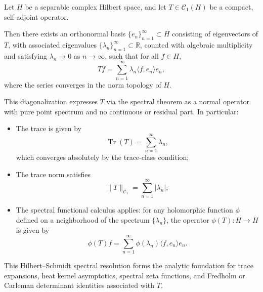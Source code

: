 \begin{definition}
\label{def:spectral_decomposition_compact}
Let \( H \) be a separable complex Hilbert space, and let \( T \in \mathcal{C}_1(H) \) be a compact, self-adjoint operator.

Then there exists an orthonormal basis \( \{ e_n \}_{n=1}^\infty \subset H \) consisting of eigenvectors of \( T \), with associated eigenvalues \( \{ \lambda_n \}_{n=1}^\infty \subset \mathbb{R} \), counted with algebraic multiplicity and satisfying \( \lambda_n \to 0 \) as \( n \to \infty \), such that for all \( f \in H \),
\[
T f = \sum_{n=1}^\infty \lambda_n \langle f, e_n \rangle e_n,
\]
where the series converges in the norm topology of \( H \).

\medskip
\noindent
This diagonalization expresses \( T \) via the spectral theorem as a normal operator with pure point spectrum and no continuous or residual part. In particular:
\begin{itemize}
  \item The trace is given by
  \[
  \operatorname{Tr}(T) = \sum_{n=1}^\infty \lambda_n,
  \]
  which converges absolutely by the trace-class condition;

  \item The trace norm satisfies
  \[
  \|T\|_{\mathcal{C}_1} = \sum_{n=1}^\infty |\lambda_n|;
  \]

  \item The spectral functional calculus applies: for any holomorphic function \( \phi \) defined on a neighborhood of the spectrum \( \{\lambda_n\} \), the operator \( \phi(T) \colon H \to H \) is given by
  \[
  \phi(T) f = \sum_{n=1}^\infty \phi(\lambda_n) \langle f, e_n \rangle e_n.
  \]
\end{itemize}

\medskip
\noindent
This Hilbert–Schmidt spectral resolution forms the analytic foundation for trace expansions, heat kernel asymptotics, spectral zeta functions, and Fredholm or Carleman determinant identities associated with \( T \).
\end{definition}
% 